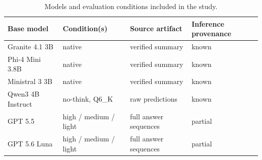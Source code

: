 \begin{table}[H]
\centering
\caption{Models and evaluation conditions included in the study.}
\label{tab:models}
\small
\begin{tabular}{llll}
\toprule
Base model & Condition(s) & Source artifact & Inference provenance \\
\midrule
Granite 4.1 3B & native & verified summary & known \\
Phi-4 Mini 3.8B & native & verified summary & known \\
Ministral 3 3B & native & verified summary & known \\
Qwen3 4B Instruct & no-think, Q6\_K & raw predictions & known \\
GPT 5.5 & high / medium / light & full answer sequences & partial \\
GPT 5.6 Luna & high / medium / light & full answer sequences & partial \\
\bottomrule
\end{tabular}
\end{table}
